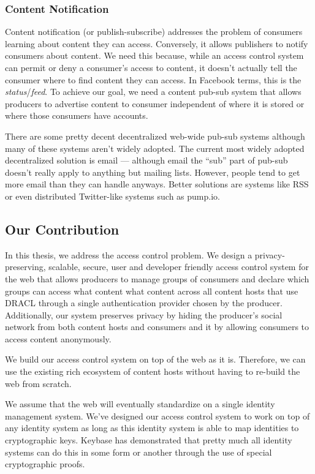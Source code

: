 \documentclass[pdftex,12pt,a4papaer,twoside,notitlepage]{report}
\begin{document}
\subsubsection{Content Notification}

Content notification (or publish-subscribe) addresses the problem of consumers
learning about content they can access. Conversely, it allows publishers to
notify consumers about content. We need this because, while an access control
system can permit or deny a consumer's access to content, it doesn't actually
tell the consumer where to find content they can access. In Facebook terms, this
is the \emph{status}/\emph{feed}. To achieve our goal, we need a content pub-sub
system that allows producers to advertise content to consumer independent of
where it is stored or where those consumers have accounts.

There are some pretty decent decentralized web-wide pub-sub systems although
many of these systems aren't widely adopted. The current most widely adopted
decentralized solution is email --- although email the ``sub'' part of pub-sub
doesn't really apply to anything but mailing lists. However, people tend to get
more email than they can handle anyways. Better solutions are systems like RSS
or even distributed Twitter-like systems such as pump.io\cite{pump.io}.

\subsection{Our Contribution}

In this thesis, we address the access control problem. We design a
privacy-preserving, scalable, secure, user and developer friendly access control
system for the web that allows producers to manage groups of consumers and
declare which groups can access what content what content across all content
hosts that use DRACL through a single authentication provider chosen by the
producer. Additionally, our system preserves privacy by hiding the producer's
social network from both content hosts and consumers and it by allowing
consumers to access content anonymously.

We build our access control system on top of the web as it is. Therefore, we can
use the existing rich ecosystem of content hosts without having to re-build the
web from scratch.

We assume that the web will eventually standardize on a single identity
management system. We've designed our access control system to work on top of
any identity system as long as this identity system is able to map identities to
cryptographic keys. Keybase has demonstrated that pretty much all identity
systems can do this in some form or another through the use of special
cryptographic proofs.
\end{document}
